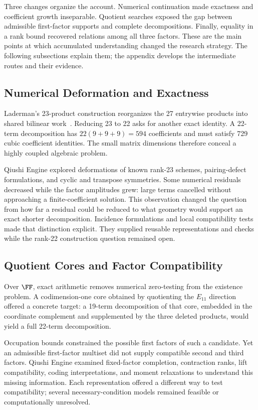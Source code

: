 Three changes organize the account. Numerical continuation made exactness
and coefficient growth inseparable. Quotient searches exposed the gap
between admissible first-factor supports and complete decompositions.
Finally, equality in a rank bound recovered relations among all three
factors. These are the main points at which accumulated understanding
changed the research strategy. The following subsections explain them;
the appendix develops the intermediate routes and their evidence.

\subsection{Numerical Deformation and Exactness}

Laderman's 23-product construction reorganizes the 27 entrywise products
into shared bilinear work~\cite{laderman1976noncommutative}. Reducing 23 to
22 asks for another exact identity. A 22-term decomposition has
$22(9+9+9)=594$ coefficients and must satisfy 729 cubic coefficient
identities. The small matrix dimensions therefore conceal a highly
coupled algebraic problem.

Qiushi Engine explored deformations of known rank-23 schemes,
pairing-defect formulations, and cyclic and transpose symmetries.
Some numerical residuals decreased while the factor amplitudes grew:
large terms cancelled without approaching a finite-coefficient solution.
This observation changed the question from how far a residual could be
reduced to what geometry would support an exact shorter decomposition.
Incidence formulations and local compatibility tests made that distinction
explicit. They supplied reusable representations and checks while the
rank-22 construction question remained open.

\subsection{Quotient Cores and Factor Compatibility}

Over $\FF$, exact arithmetic removes numerical zero-testing from the
existence problem. A codimension-one core obtained by quotienting the
$E_{11}$ direction offered a concrete target: a 19-term decomposition of
that core, embedded in the coordinate complement and supplemented by the
three deleted products, would yield a full 22-term decomposition.

Occupation bounds constrained the possible first factors of such a
candidate. Yet an admissible first-factor multiset did not supply
compatible second and third factors. Qiushi Engine examined fixed-factor
completion, contraction ranks, lift compatibility, coding interpretations,
and moment relaxations to understand this missing information. Each
representation offered a different way to test compatibility; several
necessary-condition models remained feasible or computationally unresolved.

